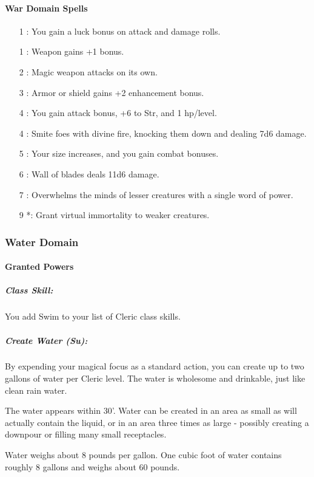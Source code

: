 \paragraph{War Domain Spells}
\begin{itemize}
\item[1] : You gain a luck bonus on attack and damage rolls.
\item[1] : Weapon gains +1 bonus.
\item[2] : Magic weapon attacks on its own.
\item[3] : Armor or shield gains +2 enhancement bonus.
\item[4] : You gain attack bonus, +6 to Str, and 1 hp/level.
\item[4] : Smite foes with divine fire, knocking them down and dealing 7d6 damage.
\item[5] : Your size increases, and you gain combat bonuses.
\item[6] : Wall of blades deals 11d6 damage.
\item[7] : Overwhelms the minds of lesser creatures with a single word of power.
\item[9] *: Grant virtual immortality to weaker creatures.
\end{itemize}
\subsubsection{Water Domain}
\paragraph{Granted Powers}
\subparagraph{Class Skill:} 
You add Swim to your list of Cleric class skills.
\subparagraph[Create Water]{Create Water (Su):}
\label{sec:CreateWater}
By expending your magical focus as a standard action, you can create up to two gallons of water per Cleric level. 
The water is wholesome and drinkable, just like clean rain water.

The water appears within 30'. Water can be created in an area as small as will actually contain the liquid, or in an area three times as large - possibly creating a downpour or filling many small receptacles.

Water weighs about 8 pounds per gallon. One cubic foot of water contains roughly 8 gallons and weighs about 60 pounds.

